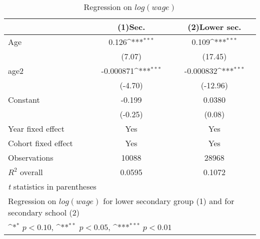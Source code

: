 \begin{table}[htbp]\centering
\def\sym#1{\ifmmode^{#1}\else\(^{#1}\)\fi}
\caption{Regression on \(log(wage)\)\label{Tab:reg1}}
\begin{tabular}{l*{2}{c}}
\toprule
                    &\multicolumn{1}{c}{(1)Sec.\label{reg1_w_heduc}}         &\multicolumn{1}{c}{(2)Lower sec.\label{reg1_w_leduc}}         \\
\midrule
Age                 &       0.126\sym{***}&       0.109\sym{***}\\
                    &      (7.07)         &     (17.45)         \\
\addlinespace
age2                &   -0.000871\sym{***}&   -0.000832\sym{***}\\
                    &     (-4.70)         &    (-12.96)         \\
\addlinespace
Constant            &      -0.199         &      0.0380         \\
                    &     (-0.25)         &      (0.08)         \\
\addlinespace
Year fixed effect & Yes             &       Yes\\
\addlinespace
Cohort fixed effect& Yes    &           Yes\\
\midrule
Observations        &       10088         &       28968         \\
$R^2$ overall       &   0.0595&0.1072 \\
\bottomrule
\multicolumn{3}{l}{\footnotesize \textit{t} statistics in parentheses}\\
\multicolumn{3}{l}{\footnotesize Regression on \(log(wage)\) for lower secondary group (1) and for secondary school (2)}\\
\multicolumn{3}{l}{\footnotesize \sym{*} \(p<0.10\), \sym{**} \(p<0.05\), \sym{***} \(p<0.01\)}\\
\end{tabular}
\end{table}
